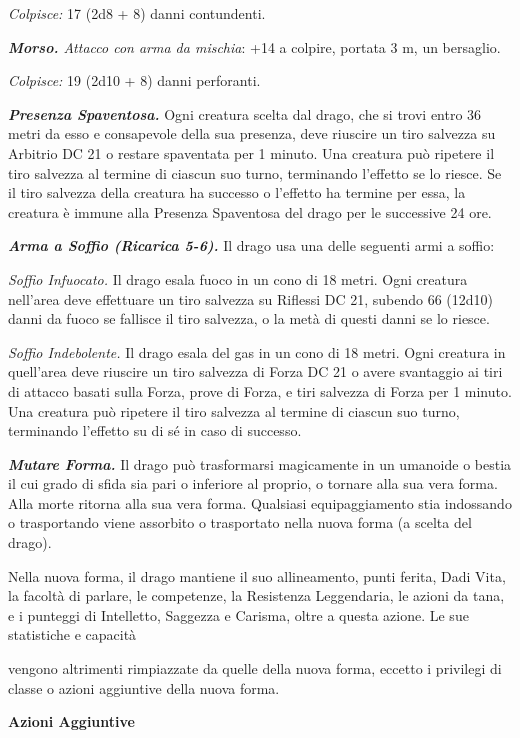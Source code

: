 \begin{multicols}{2}
\emph{Colpisce:} 17 (2d8 + 8) danni contundenti.

\emph{\textbf{Morso.} Attacco con arma da mischia}: +14 a colpire,
portata 3 m, un bersaglio.

\emph{Colpisce:} 19 (2d10 + 8) danni perforanti.

\emph{\textbf{Presenza Spaventosa.}} Ogni creatura scelta dal drago, che
si trovi entro 36 metri da esso e consapevole della sua presenza, deve
riuscire un tiro salvezza su Arbitrio DC 21 o restare spaventata per 1
minuto. Una creatura può ripetere il tiro salvezza al termine di ciascun
suo turno, terminando l'effetto se lo riesce. Se il tiro salvezza della
creatura ha successo o l'effetto ha termine per essa, la creatura è
immune alla Presenza Spaventosa del drago per le successive 24 ore.

\emph{\textbf{Arma a Soffio (Ricarica 5-6).}} Il drago usa una delle
seguenti armi a soffio:

\emph{Soffio Infuocato.} Il drago esala fuoco in un cono di 18 metri.
Ogni creatura nell'area deve effettuare un tiro salvezza su Riflessi DC
21, subendo 66 (12d10) danni da fuoco se fallisce il tiro salvezza, o la
metà di questi danni se lo riesce.

\emph{Soffio Indebolente.} Il drago esala del gas in un cono di 18
metri. Ogni creatura in quell'area deve riuscire un tiro salvezza di Forza DC 21 o avere svantaggio ai tiri di attacco basati sulla Forza,
prove di Forza, e tiri salvezza di Forza per 1 minuto. Una creatura può
ripetere il tiro salvezza al termine di ciascun suo turno, terminando
l'effetto su di sé in caso di successo.

\emph{\textbf{Mutare Forma.}} Il drago può trasformarsi magicamente in
un umanoide o bestia il cui grado di sfida sia pari o inferiore al
proprio, o tornare alla sua vera forma. Alla morte ritorna alla sua vera
forma. Qualsiasi equipaggiamento stia indossando o trasportando viene
assorbito o trasportato nella nuova forma (a scelta del drago).

Nella nuova forma, il drago mantiene il suo allineamento, punti ferita,
Dadi Vita, la facoltà di parlare, le competenze, la Resistenza
Leggendaria, le azioni da tana, e i punteggi di Intelletto, Saggezza e
Carisma, oltre a questa azione. Le sue statistiche e capacità

vengono altrimenti rimpiazzate da quelle della nuova forma, eccetto i
privilegi di classe o azioni aggiuntive della nuova forma.

\textbf{Azioni Aggiuntive}


\end{multicols}
